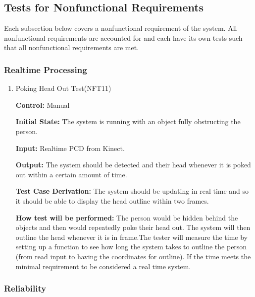 \documentclass[12pt, titlepage]{article}
\begin{document}
\subsection{Tests for Nonfunctional Requirements}

Each subsection below covers a nonfunctional requirement of the system. All nonfunctional requirements are accounted for and each have its own tests such that all nonfunctional requirements are met.

\subsubsection{Realtime Processing}

\begin{enumerate}

\item{Poking Head Out Test(NFT11)\label{NFT11}\\}

\textbf{Control:} Manual

\textbf{Initial State:} The system is running with an object fully obstructing the person.

\textbf{Input:} Realtime PCD from Kinect.

\textbf{Output:} The system should be detected and their head whenever it is poked out within a certain amount of time.

\textbf{Test Case Derivation:} The system should be updating in real time and so it should be able to display the head outline within two frames.

\textbf{How test will be performed:} The person would be hidden behind the objects and then would repeatedly poke their head out. The system will then outline the head whenever it is in frame.The tester will measure the time by setting up a function to see how long the system takes to outline the person (from read input to having the coordinates for outline). If the time meets the minimal requirement to be considered a real time system.

\end{enumerate}

\subsubsection{Reliability}
\end{document}
